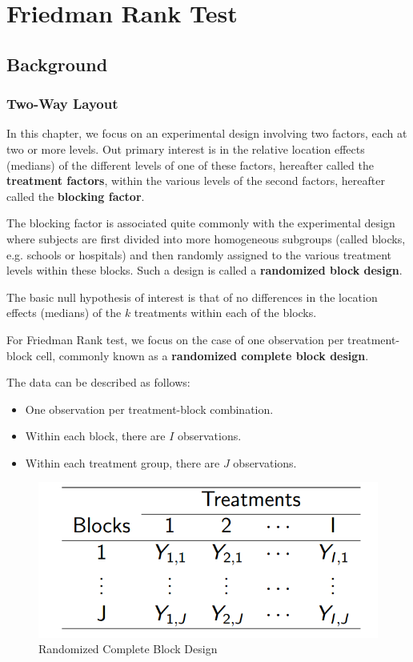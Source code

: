 \section{Friedman Rank Test}
\subsection{Background}
\subsubsection{Two-Way Layout}
In this chapter, we focus on an experimental design involving two factors, each at two or more levels. Out primary interest is in the relative location effects (medians) of the different levels of one of these factors, hereafter called the \textbf{treatment factors}, within the various levels of the second factors, hereafter called the \textbf{blocking factor}.

The blocking factor is associated quite commonly with the experimental design where subjects are first divided into more homogeneous subgroups (called blocks, e.g. schools or hospitals) and then randomly assigned to the various treatment levels within these blocks. Such a design is called a \textbf{randomized block design}.

The basic null hypothesis of interest is that of no differences in the location effects (medians) of the $k$ treatments within each of the blocks.

For Friedman Rank test, we focus on the case of one observation per treatment-block cell, commonly known as a \textbf{randomized complete block design}.

The data can be described as follows:
\begin{itemize}
	\item One observation per treatment-block combination.
	\item Within each block, there are $I$ observations.
	\item Within each treatment group, there are $J$ observations.
\end{itemize}

\begin{figure}[H]
	\centering
	\includegraphics[width=0.5\linewidth]{fig/randomized-complete-block-design}
	\caption{Randomized Complete Block Design}
	\label{fig:randomized-complete-block-design}
\end{figure}

